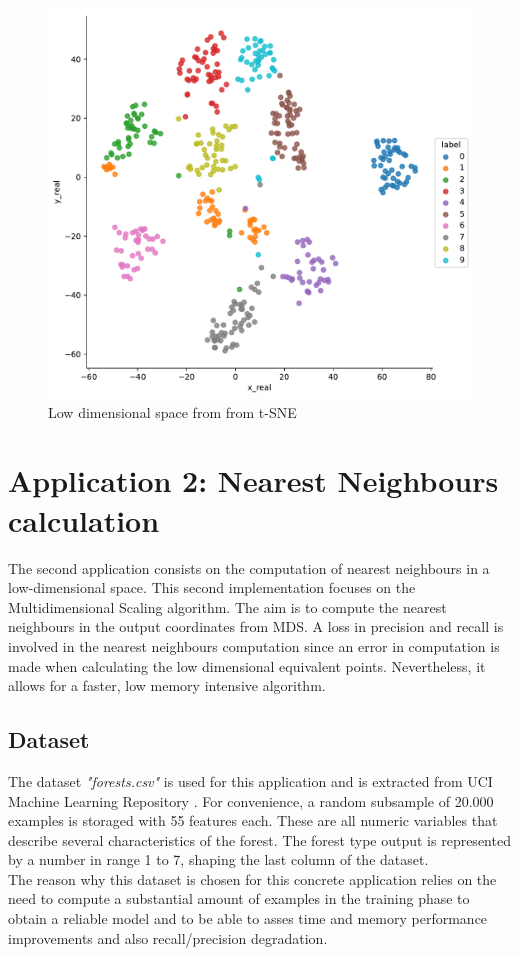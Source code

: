 \documentclass[a4paper,11pt,spanish]{report}
\begin{document}
\begin{figure}
\centering
\includegraphics[width=12cm]{figures/app1plotreal.pdf}
\caption{\label{figureTSNE}Low dimensional space from from t-SNE}
\end{figure}

\newpage

\section{Application 2: Nearest Neighbours calculation}
\label{sec:app2}

The second application consists on the computation of nearest neighbours in a low-dimensional space. This second implementation focuses on the Multidimensional Scaling algorithm. The aim is to compute the nearest neighbours in the output coordinates from MDS. A loss in precision and recall is involved in the nearest neighbours computation since an error in computation is made when calculating the low dimensional equivalent points. Nevertheless, it allows for a faster, low memory intensive algorithm.

\subsection{Dataset}
\label{ssec:data2}

The dataset \textit{"forests.csv"} is used for this application and is extracted from UCI Machine Learning Repository \citep{ucidata}. For convenience, a random subsample of 20.000 examples is storaged with 55 features each. These are all numeric variables that describe several characteristics of the forest. The forest type output is represented by a number in range 1 to 7, shaping the last column of the dataset.\\
The reason why this dataset is chosen for this concrete application relies on the need to compute a substantial amount of examples in the training phase to obtain a reliable model and to be able to asses time and memory performance improvements and also recall/precision degradation.
\end{document}

